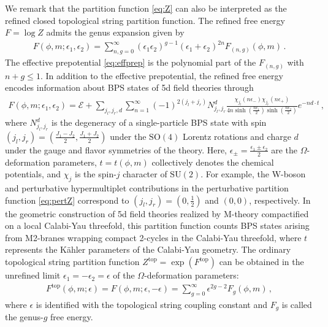 \documentclass[11pt, a4paper]{article}
\theoremstyle{definition}
\begin{document}
We remark that the partition function \eqref{eq:Z} can also be interpreted as the refined closed topological string partition function. The refined free energy $ F = \log Z $ admits the genus expansion given by
\begin{align}\label{eq:topexpandrefine}
    F(\phi,m;\epsilon_1,\epsilon_2) = \sum_{n,g=0}^\infty (\epsilon_1 \epsilon_2)^{g-1} (\epsilon_1+\epsilon_2)^{2n} F_{(n,g)}(\phi,m) \, .
\end{align}
The effective prepotential \eqref{eq:effprep} is the polynomial part of the $ F_{(n,g)} $ with $ n+g \leq 1 $. In addition to the effective prepotential, the refined free energy encodes information about BPS states of 5d field theories through
\begin{align}\label{eq:gv}
    F(\phi,m;\epsilon_1,\epsilon_2) = \mathcal{E} + \sum_{j_l,j_r,d} \sum_{n=1}^\infty (-1)^{2(j_l+j_r)} N_{j_l,j_r}^{d} \frac{ \chi_{j_l}(n\epsilon_-) \chi_{j_r}(n\epsilon_+)}{4n\sinh(\frac{n \epsilon_1}{2}) \sinh(\frac{n \epsilon_2}{2})} e^{-n d \cdot t} \, ,
\end{align}
where $ N_{j_l,j_r}^{d} $ is the degeneracy of a single-particle BPS state with spin $ (j_l,j_r) = (\frac{J_1-J_2}{2}, \frac{J_1+J_2}{2}) $ under the $ \mathrm{SO}(4) $ Lorentz rotations and charge $ d $ under the gauge and flavor symmetries of the theory. Here, $ \epsilon_\pm = \frac{\epsilon_1\pm \epsilon_2}{2} $ are the $ \Omega $-deformation parameters, $ t=t(\phi,m) $ collectively denotes the chemical potentials, and $ \chi_j $ is the spin-$ j $ character of $ \mathrm{SU}(2) $. For example, the W-boson and perturbative hypermultiplet contributions in the perturbative partition function \eqref{eq:pertZ} correspond to $ (j_l,j_r)=(0,\frac{1}{2}) $ and $ (0,0) $, respectively. In the geometric construction of 5d field theories realized by M-theory compactified on a local Calabi-Yau threefold, this partition function counts BPS states arising from M2-branes wrapping compact 2-cycles in the Calabi-Yau threefold, where $ t $ represents the K\"ahler parameters of the Calabi-Yau geometry. The ordinary topological string partition function $ Z^{\mathrm{top}} = \exp(F^{\mathrm{top}}) $ can be obtained in the unrefined limit $ \epsilon_1 = -\epsilon_2 = \epsilon $ of the $ \Omega $-deformation parameters:
\begin{align}\label{eq:topexpandunrefine}
    F^{\mathrm{top}}(\phi,m;\epsilon) = F(\phi,m;\epsilon,-\epsilon) = \sum_{g=0}^\infty \epsilon^{2g-2} F_g(\phi,m) \, ,
\end{align}
where $ \epsilon $ is identified with the topological string coupling constant and $ F_g $ is called the genus-$ g $ free energy.
\end{document}
